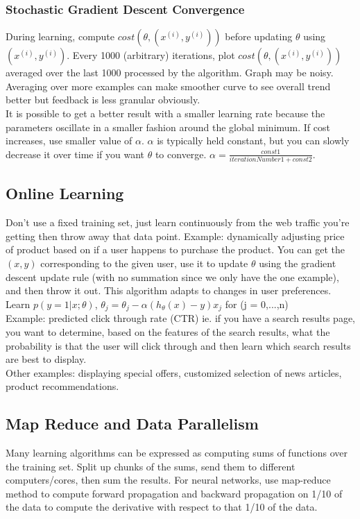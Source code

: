 \documentclass[11pt,letterpaper]{article}
\begin{document}
\subsubsection{Stochastic Gradient Descent Convergence}
During learning, compute $cost(\theta, (x^{(i)}, y^{(i)}))$ before updating $\theta$ using $(x^{(i)}, y^{(i)})$. Every 1000 (arbitrary) iterations, plot 	$cost(\theta, (x^{(i)}, y^{(i)}))$ averaged over the last 1000 processed by the algorithm. Graph may be noisy. Averaging over more examples can make smoother curve to see overall trend better but feedback is less granular obviously.\\
It is possible to get a better result with a smaller learning rate because the parameters oscillate in a smaller fashion around the global minimum. If  cost increases, use smaller value of $\alpha$. $\alpha$ is typically held constant, but you can slowly decrease it over time if you want $\theta$ to converge. $\alpha = \frac{const1}{iterationNumber1 + const2}$.
\subsection{Online Learning}
Don't use a fixed training set, just learn continuously from the web traffic you're getting then throw away that data point. 
Example: dynamically adjusting price of product based on if a user happens to purchase the product. You can get the $(x,y)$ corresponding to the given user, use it to update $\theta$ using the gradient descent update rule (with no summation since we only have the one example), and then throw it out. This algorithm adapts to changes in user preferences. Learn $p(y=1|x;\theta)$, $\theta_j = \theta_j - \alpha(h_\theta(x) - y)x_j$ for (j = 0,...,n)\\
Example: predicted click through rate (CTR) ie. if you have a search results page, you want to determine, based on the features of the search results, what the probability is that the user will click through and then learn which search results are best to display.\\
Other examples: displaying special offers, customized selection of news articles, product recommendations.
\subsection{Map Reduce and Data Parallelism}
Many learning algorithms can be expressed as computing sums of functions over the training set. Split up chunks of the sums, send them to different computers/cores, then sum the results. For neural networks, use map-reduce method to compute forward propagation and backward propagation on 1/10 of the data to compute the derivative with respect to that 1/10 of the data. 
\end{document}
